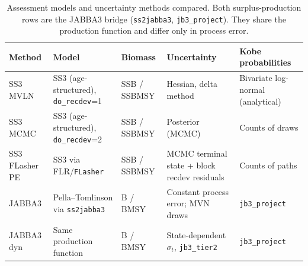 \begin{table}[htbp]

\caption{\label{tab:design}Assessment models and uncertainty methods compared. Both surplus-production rows are the JABBA3 bridge (\texttt{ss2jabba3}, \texttt{jb3\_project}). They share the production function and differ only in process error.}
\centering
\begin{tabular}[t]{>{\raggedright\arraybackslash}p{}>{\raggedright\arraybackslash}p{}>{\raggedright\arraybackslash}p{}>{\raggedright\arraybackslash}p{}>{\raggedright\arraybackslash}p{}}
\toprule
Method & Model & Biomass & Uncertainty & Kobe probabilities\\
\midrule
SS3 MVLN & SS3 (age-structured), \texttt{do\_recdev}=1 & SSB / SSBMSY & Hessian, delta method & Bivariate log-normal (analytical)\\
SS3 MCMC & SS3 (age-structured), \texttt{do\_recdev}=2 & SSB / SSBMSY & Posterior (MCMC) & Counts of draws\\
SS3 FLasher PE & SS3 via FLR/\texttt{FLasher} & SSB / SSBMSY & MCMC terminal state + block recdev residuals & Counts of paths\\
JABBA3 & Pella--Tomlinson via \texttt{ss2jabba3} & B / BMSY & Constant process error; MVN draws & \texttt{jb3\_project}\\
JABBA3 dyn & Same production function & B / BMSY & State-dependent $\sigma_t$, \texttt{jb3\_tier2} & \texttt{jb3\_project}\\
\bottomrule
\end{tabular}
\end{table}
